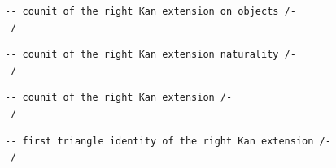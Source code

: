 \documentclass{book}
\theoremstyle{definition}
\newcounter{lcounter}
\begin{document}
\begin{center} \begin{tcolorbox}[width=5in,colback={white},title={\begin{center}\texttt{Lean \thelcounter} \addtocounter{lcounter}{1} \end{center}},colbacktitle=Blue,coltitle=black] \begin{verbatim}
-- counit of the right Kan extension on objects /-
-/
\end{verbatim} \end{tcolorbox} \end{center}

 \begin{center} \begin{tcolorbox}[width=5in,colback={white},title={\begin{center}\texttt{Lean \thelcounter} \addtocounter{lcounter}{1} \end{center}},colbacktitle=Blue,coltitle=black] \begin{verbatim}
-- counit of the right Kan extension naturality /-
-/
\end{verbatim} \end{tcolorbox} \end{center}
\begin{center} \begin{tcolorbox}[width=5in,colback={white},title={\begin{center}\texttt{Lean \thelcounter} \addtocounter{lcounter}{1} \end{center}},colbacktitle=Blue,coltitle=black] \begin{verbatim}
-- counit of the right Kan extension /-
-/
\end{verbatim} \end{tcolorbox} \end{center}
\begin{center} \begin{tcolorbox}[width=5in,colback={white},title={\begin{center}\texttt{Lean \thelcounter} \addtocounter{lcounter}{1} \end{center}},colbacktitle=Blue,coltitle=black] \begin{verbatim}
-- first triangle identity of the right Kan extension /-
-/
\end{verbatim} \end{tcolorbox} \end{center}
\end{document}
